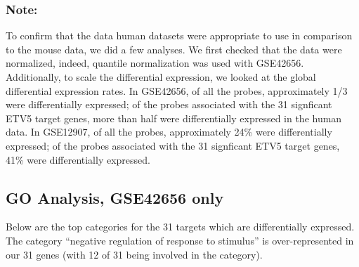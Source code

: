 \documentclass{article}\usepackage[]{graphicx}\usepackage[]{color}
\begin{document}
\subsubsection{Note:}

To confirm that the data human datasets were appropriate to use in comparison to the mouse data, we did a few analyses.  We first checked that the data were normalized, indeed, quantile normalization was used with GSE42656.  Additionally, to scale the differential expression, we looked at the global differential expression rates.  In GSE42656, of all the probes, approximately 1/3 were differentially expressed;  of the probes associated with the 31 signficant ETV5 target genes, more than half were differentially expressed in the human data.  In GSE12907, of all the probes, approximately 24\% were differentially expressed;  of the probes associated with the 31 signficant ETV5 target genes, 41\% were differentially expressed.

\subsection{GO Analysis, GSE42656 only}

Below are the top categories for the 31 targets which are differentially expressed.  The category ``negative regulation of response to stimulus''  is over-represented in our 31 genes (with 12 of 31 being involved in the category).
\end{document}
